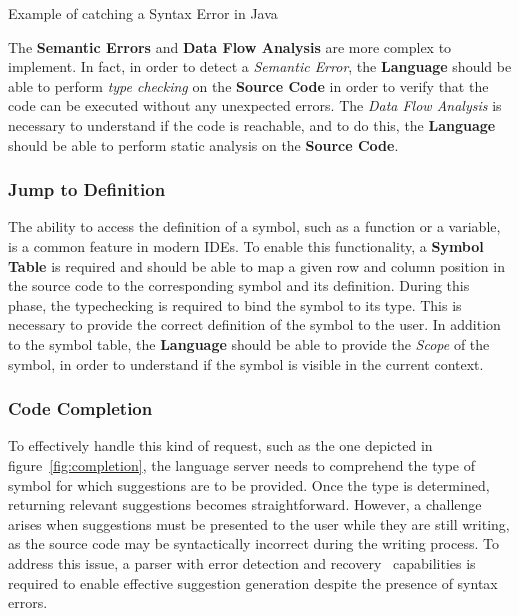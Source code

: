 \begin{Listing}[t]
    \centering
    \caption{Example of catching a Syntax Error in Java}
    \label{lst:concept:SyntaxError}
\end{Listing}

The \textbf{Semantic Errors} and \textbf{Data Flow Analysis} are more complex to implement. In fact, in order to detect a \textit{Semantic Error}, the \textbf{Language} should be able to perform \textit{type checking} on the \textbf{Source Code} in order to verify that the code can be executed without any unexpected errors. The \textit{Data Flow Analysis} is necessary to understand if the code is reachable, and to do this, the \textbf{Language} should be able to perform static analysis on the \textbf{Source Code}.

\subsubsection{Jump to Definition}\label{subsubsec:concept:JumpToDefinition}
The ability to access the definition of a symbol, such as a function or a variable, is a common feature in modern IDEs.
To enable this functionality, a \textbf{Symbol Table} is required and should be able to map a given row and column position in the source code to the corresponding symbol and its definition.
During this phase, the typechecking is required to bind the symbol to its type. This is necessary to provide the correct definition of the symbol to the user.
In addition to the symbol table, the \textbf{Language} should be able to provide the \textit{Scope} of the symbol, in order to understand if the symbol is visible in the current context.

\subsubsection{Code Completion}\label{subsubsec:concept:CodeCompletion}

To effectively handle this kind of request, such as the one depicted in figure~\ref{fig:completion}, the language server needs to comprehend the type of symbol for which suggestions are to be provided. Once the type is determined, returning relevant suggestions becomes straightforward. However, a challenge arises when suggestions must be presented to the user while they are still writing, as the source code may be syntactically incorrect during the writing process. To address this issue, a parser with error detection and recovery~\cite{Graham79} capabilities is required to enable effective suggestion generation despite the presence of syntax errors.

